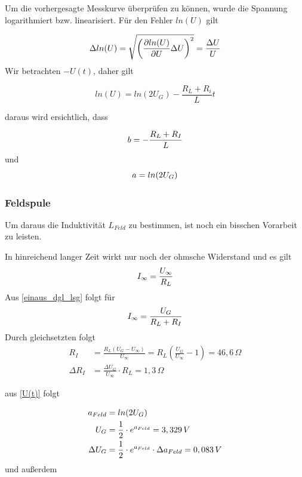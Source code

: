 \documentclass{article}
\begin{document}
Um die vorhergesagte Messkurve überprüfen zu können, wurde die Spannung logarithmiert bzw. linearisiert. Für den Fehler \(ln(U)\) gilt

\begin{align}
\Delta ln(U) = \sqrt{\left(\frac{\partial ln(U)}{\partial U} \Delta U \right)^2} = \frac{\Delta U}{U}
\notag
\end{align}
\noindent
Wir betrachten \(-U(t)\), daher gilt

\begin{equation}
\label{U(t)}
ln(U) = ln(2U_G) - \frac{R_L+R_i}{L} t
\end{equation}


\noindent
daraus wird ersichtlich, dass



\begin{equation}
b = - \frac{R_L + R_I}{L}
\notag
\end{equation}
und
\begin{equation}
a = ln(2 U_G)
\notag
\end{equation}

\subsubsection{Feldspule}
Um daraus die Induktivität \(L_{Feld}\) zu bestimmen, ist noch ein bisschen Vorarbeit zu leisten.

In hinreichend langer Zeit wirkt nur noch der ohmsche Widerstand und es gilt
\begin{equation}
I_\infty = \frac{U_\infty}{R_L}
\notag
\end{equation}
\noindent
Aus \eqref{einaus_dgl_lsg} folgt für 
\begin{equation}
I_\infty = \frac{U_G}{R_L+R_I}
\notag
\end{equation}
Durch gleichsetzten folgt
\begin{align}
R_I &= \frac{R_L \left( U_G - U_\infty \right)}{U_\infty} = 
R_L \left(\frac{U_G}{U_\infty} - 1 \right) = 46,6 \, \Omega
\label{R_I}
\\
\Delta R_I &= \frac{\Delta U_G}{U_\infty} \cdot R_L = 1,3 \, \Omega
\end{align}

\noindent
aus \eqref{U(t)} folgt 

\begin{align}
a_{Feld} &= ln(2U_G)
\notag
\\
U_G &= \frac{1}{2} \cdot e^{a_{Feld}} = 3,329 \, V
\notag
\\
\Delta U_G &= \frac{1}{2} \cdot e^{a_{Feld}} \cdot \Delta a_{Feld} = 0,083 \, V
\notag
\end{align}
\noindent
und außerdem
\end{document}
